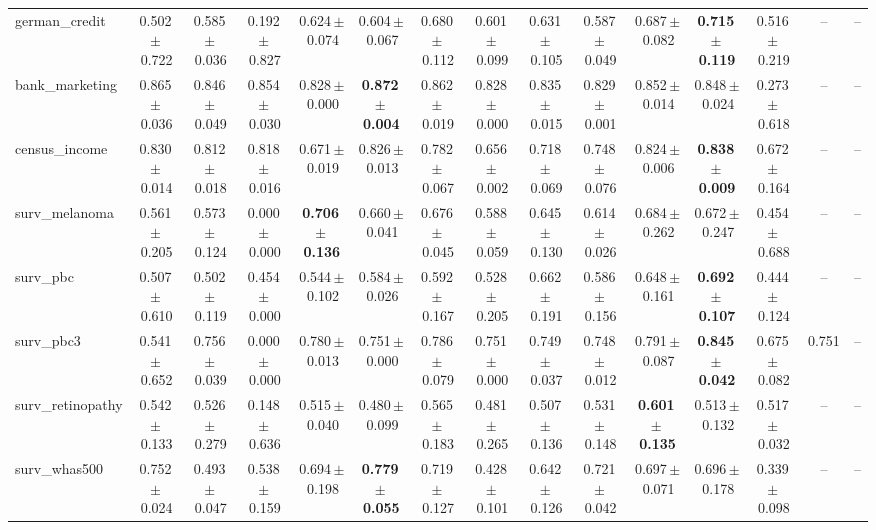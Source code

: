 \documentclass[8pt]{extarticle}
\begin{document}
\begin{longtable}{l*{14}{c}}
german\_credit & 0.502\,$\pm$\,0.722 & 0.585\,$\pm$\,0.036 & 0.192\,$\pm$\,0.827 & 0.624\,$\pm$\,0.074 & 0.604\,$\pm$\,0.067 & 0.680\,$\pm$\,0.112 & 0.601\,$\pm$\,0.099 & 0.631\,$\pm$\,0.105 & 0.587\,$\pm$\,0.049 & 0.687\,$\pm$\,0.082 & \textbf{0.715\,$\pm$\,0.119} & 0.516\,$\pm$\,0.219 & -- & -- \\
bank\_marketing & 0.865\,$\pm$\,0.036 & 0.846\,$\pm$\,0.049 & 0.854\,$\pm$\,0.030 & 0.828\,$\pm$\,0.000 & \textbf{0.872\,$\pm$\,0.004} & 0.862\,$\pm$\,0.019 & 0.828\,$\pm$\,0.000 & 0.835\,$\pm$\,0.015 & 0.829\,$\pm$\,0.001 & 0.852\,$\pm$\,0.014 & 0.848\,$\pm$\,0.024 & 0.273\,$\pm$\,0.618 & -- & -- \\
census\_income & 0.830\,$\pm$\,0.014 & 0.812\,$\pm$\,0.018 & 0.818\,$\pm$\,0.016 & 0.671\,$\pm$\,0.019 & 0.826\,$\pm$\,0.013 & 0.782\,$\pm$\,0.067 & 0.656\,$\pm$\,0.002 & 0.718\,$\pm$\,0.069 & 0.748\,$\pm$\,0.076 & 0.824\,$\pm$\,0.006 & \textbf{0.838\,$\pm$\,0.009} & 0.672\,$\pm$\,0.164 & -- & -- \\
surv\_melanoma & 0.561\,$\pm$\,0.205 & 0.573\,$\pm$\,0.124 & 0.000\,$\pm$\,0.000 & \textbf{0.706\,$\pm$\,0.136} & 0.660\,$\pm$\,0.041 & 0.676\,$\pm$\,0.045 & 0.588\,$\pm$\,0.059 & 0.645\,$\pm$\,0.130 & 0.614\,$\pm$\,0.026 & 0.684\,$\pm$\,0.262 & 0.672\,$\pm$\,0.247 & 0.454\,$\pm$\,0.688 & -- & -- \\
surv\_pbc & 0.507\,$\pm$\,0.610 & 0.502\,$\pm$\,0.119 & 0.454\,$\pm$\,0.000 & 0.544\,$\pm$\,0.102 & 0.584\,$\pm$\,0.026 & 0.592\,$\pm$\,0.167 & 0.528\,$\pm$\,0.205 & 0.662\,$\pm$\,0.191 & 0.586\,$\pm$\,0.156 & 0.648\,$\pm$\,0.161 & \textbf{0.692\,$\pm$\,0.107} & 0.444\,$\pm$\,0.124 & -- & -- \\
surv\_pbc3 & 0.541\,$\pm$\,0.652 & 0.756\,$\pm$\,0.039 & 0.000\,$\pm$\,0.000 & 0.780\,$\pm$\,0.013 & 0.751\,$\pm$\,0.000 & 0.786\,$\pm$\,0.079 & 0.751\,$\pm$\,0.000 & 0.749\,$\pm$\,0.037 & 0.748\,$\pm$\,0.012 & 0.791\,$\pm$\,0.087 & \textbf{0.845\,$\pm$\,0.042} & 0.675\,$\pm$\,0.082 & 0.751 & -- \\
surv\_retinopathy & 0.542\,$\pm$\,0.133 & 0.526\,$\pm$\,0.279 & 0.148\,$\pm$\,0.636 & 0.515\,$\pm$\,0.040 & 0.480\,$\pm$\,0.099 & 0.565\,$\pm$\,0.183 & 0.481\,$\pm$\,0.265 & 0.507\,$\pm$\,0.136 & 0.531\,$\pm$\,0.148 & \textbf{0.601\,$\pm$\,0.135} & 0.513\,$\pm$\,0.132 & 0.517\,$\pm$\,0.032 & -- & -- \\
surv\_whas500 & 0.752\,$\pm$\,0.024 & 0.493\,$\pm$\,0.047 & 0.538\,$\pm$\,0.159 & 0.694\,$\pm$\,0.198 & \textbf{0.779\,$\pm$\,0.055} & 0.719\,$\pm$\,0.127 & 0.428\,$\pm$\,0.101 & 0.642\,$\pm$\,0.126 & 0.721\,$\pm$\,0.042 & 0.697\,$\pm$\,0.071 & 0.696\,$\pm$\,0.178 & 0.339\,$\pm$\,0.098 & -- & -- \\

\end{longtable}
\end{document}
